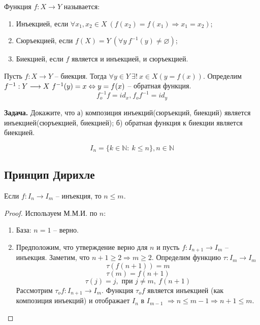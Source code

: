     \begin{definition}
        Функция $f: X \longrightarrow Y$ называется:
        \begin{enumerate}[label={(\alph*)}]
            \item Инъекцией, если $\forall x_{1},x_{2} \in X \ (f(x_{2}) = f(x_{1}) \Rightarrow x_{1} = x_{2})$;
            \item Сюръекцией, если $f(X) = Y \ (\forall y \ f^{-1}(y) \neq \varnothing)$;
            \item Биекцией, если $f$ является и инъекцией, и сюръекцией.
        \end{enumerate}
    \end{definition}
    
    Пусть $f: X \longrightarrow Y$ -- биекция. Тогда $\forall y \in Y \ \exists ! \ x \in X (y = f(x))$. Определим $f^{-1}: Y \longrightarrow X \ f^{-1}(y) = x \lra y = f(x)$ -- обратная функция.
    \[f^{-1}_{o}f = id_{x} \text{,} \  f_{o}f^{-1} = id_{y}\]
    
    \textbf{Задача.} Докажите, что а) композиция инъекций(сюръекций, биекций) является инъекцией(сюръекцией, биекцией); б) обратная функция к биекции является биекцией.
    
    \[I_{n} = \{ k \in \mathds{N}: \ k \leq n\}, n \in \mathds{N}\]
    
\subsection{Принцип Дирихле}
    
    \begin{theorem}
        Если $f: I_{n} \longrightarrow I_{m}$ -- инъекция, то $n \leq m$.
    \end{theorem}
    
    \begin{proof}
        Используем М.М.И. по $n$:
        \begin{enumerate}
            \item База: $n = 1$ -- верно.
            \item Предположим, что утверждение верно для $n$ и пусть $f: I_{n+1} \longrightarrow I_{m}$ -- инъекция. Заметим, что $n + 1 \geq 2 \Rightarrow m \geq 2$. Определим функцию $\tau: I_{m} \longrightarrow I_{m}$
            \[\tau (f(n + 1)) = m\]
            \[\tau (m) = f(n + 1)\]
            \[\tau (j) = j, \text{ при } j \neq m, \  f(n + 1)\]
            Рассмотрим $\tau_{o}f: I_{n + 1} \longrightarrow I_{m}$. Функция $\tau_{o}f$ является инъекцией (как композиция инъекций) и отображает $I_{n}$ в $I_{m - 1}$ $\Rightarrow n \leq m - 1 \Rightarrow n + 1 \leq m$. 
        \end{enumerate}
    \end{proof}
    
